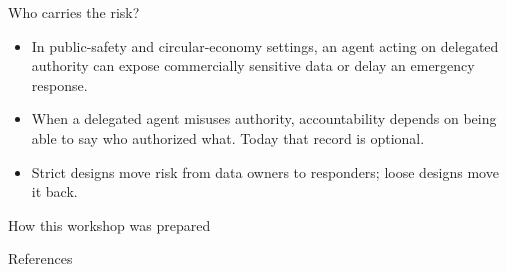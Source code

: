 \documentclass[aspectratio=169, 10pt]{beamer}
\begin{document}
\begin{frame}{Who carries the risk?}
  \begin{itemize}
    \item In public-safety and circular-economy settings, an agent acting on delegated authority can expose commercially sensitive data or delay an emergency response.
    \item When a delegated agent misuses authority, accountability depends on being able to say who authorized what. Today that record is optional.
    \item Strict designs move risk from data owners to responders; loose designs move it back.
  \end{itemize}
\end{frame}

\begin{frame}{How this workshop was prepared}
  \centering{}
\end{frame}

\begin{frame}[allowframebreaks]{References}
  \printbibliography[heading=none]
\end{frame}
\end{document}
